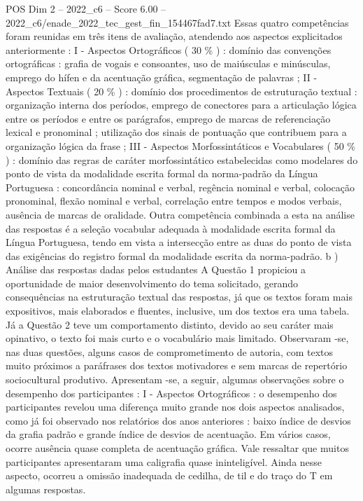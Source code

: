 \begin{textsample}{POS Dim 2 – 2022\_c6 – Score 6.00 – 2022\_c6/enade\_2022\_tec\_gest\_fin\_154467fad7.txt}
Essas quatro competências foram reunidas em três itens de avaliação, atendendo aos aspectos explicitados anteriormente : I - Aspectos Ortográficos ( 30 \% ) : domínio das convenções ortográficas : grafia de vogais e consoantes, uso de maiúsculas e minúsculas, emprego do hífen e da acentuação gráfica, segmentação de palavras ; II - Aspectos Textuais ( 20 \% ) : domínio dos procedimentos de estruturação textual : organização interna dos períodos, emprego de conectores para a articulação lógica entre os períodos e entre os parágrafos, emprego de marcas de referenciação lexical e pronominal ; utilização dos sinais de pontuação que contribuem para a organização lógica da frase ; III - Aspectos Morfossintáticos e Vocabulares ( 50 \% ) : domínio das regras de caráter morfossintático estabelecidas como modelares do ponto de vista da modalidade escrita formal da norma-padrão da Língua Portuguesa : concordância nominal e verbal, regência nominal e verbal, colocação pronominal, flexão nominal e verbal, correlação entre tempos e modos verbais, ausência de marcas de oralidade.
Outra competência combinada a esta na análise das respostas é a seleção vocabular adequada à modalidade escrita formal da Língua Portuguesa, tendo em vista a intersecção entre as duas do ponto de vista das exigências do registro formal da modalidade escrita da norma-padrão. b ) Análise das respostas dadas pelos estudantes A Questão 1 propiciou a oportunidade de maior desenvolvimento do tema solicitado, gerando consequências na estruturação textual das respostas, já que os textos foram mais expositivos, mais elaborados e fluentes, inclusive, um dos textos era uma tabela.
Já a Questão 2 teve um comportamento distinto, devido ao seu caráter mais opinativo, o texto foi mais curto e o vocabulário mais limitado.
Observaram -se, nas duas questões, alguns casos de comprometimento de autoria, com textos muito próximos a paráfrases dos textos motivadores e sem marcas de repertório sociocultural produtivo.
Apresentam -se, a seguir, algumas observações sobre o desempenho dos participantes : I - Aspectos Ortográficos : o desempenho dos participantes revelou uma diferença muito grande nos dois aspectos analisados, como já foi observado nos relatórios dos anos anteriores : baixo índice de desvios da grafia padrão e grande índice de desvios de acentuação.
Em vários casos, ocorre ausência quase completa de acentuação gráfica.
Vale ressaltar que muitos participantes apresentaram uma caligrafia quase ininteligível.
Ainda nesse aspecto, ocorreu a omissão inadequada de cedilha, de til e do traço do T em algumas respostas.

\end{textsample}
